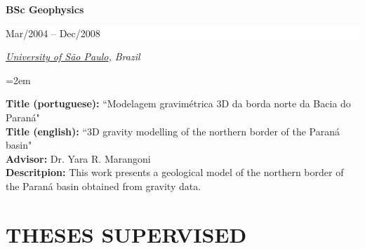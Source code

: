 \documentclass[paper=letter,fontsize=11pt]{scrartcl} %
\newcommand{\sepspace}{\vspace*{1em}}		%
\newcommand{\NewPart}[2]{\section*{\uppercase{#1} #2}}
\newcommand{\EducationEntry}[4]{
		\noindent \textbf{#1} \hfill      %
		\colorbox{White}{%
			\parbox{10em}{%
			\hfill\color{Black}#2}} \par  %
		\noindent \textit{#3} \par        %
		\noindent\hangindent=2em\hangafter=0 \small #4 %
		\normalsize \par}
\newcommand{\ArxivEntry}[3]{
		\noindent #1, ``\href{http://arxiv.org/abs/#3}{#2}", \textit{{cond-mat/}#3}.}
\begin{document}
\sepspace

\EducationEntry{\Large BSc Geophysics}{\begin{flushright} Mar/2004 -- Dec/2008 \end{flushright} \vspace{-0.2in}}{\href{http://www.iag.usp.br/international/}{University of S\~{a}o Paulo}, Brazil}

\sepspace \noindent
\textbf{Title (portuguese):} ``Modelagem gravim\'{e}trica 3D da borda norte da Bacia do Paran\'{a}" \\
\textbf{Title (english):} ``3D gravity modelling of the northern border of the Paran\'{a} basin" \\
\textbf{Advisor:} Dr. Yara R. Marangoni \\
\textbf{Descritpion:} This work presents a geological model of the northern border of the Paran\'{a} basin obtained from gravity data.

\sepspace


\renewcommand{\refname}{PEER-REVIEWED JOURNAL PAPERS (\href{http://orcid.org/0000-0002-6338-4086}{ORCID})}
\nocite{*}






\sepspace

\NewPart{Theses Supervised}{}
\end{document}
